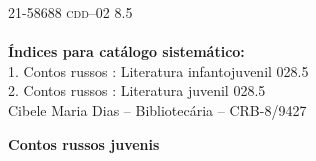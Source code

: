 \begin{flushleft}
\hspace{20pt}21-58688 \hspace{138pt}\textsc{cdd}--02	8.5\\
\hrulefill\\
\textbf{Índices para catálogo sistemático:}\\
1. Contos russos : Literatura infantojuvenil 028.5\\
2. Contos russos : Literatura juvenil 028.5\\
Cibele Maria Dias -- Bibliotecária -- CRB-8/9427
\end{flushleft}


\pagebreak
\thispagestyle{empty}
			\Huge 
            \textbf{Contos russos juvenis}




\endgroup
\pagebreak